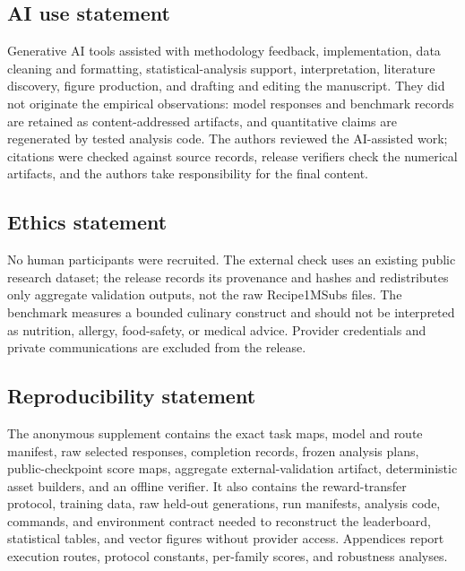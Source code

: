 \documentclass{article}
\begin{document}
\clearpage
\subsection*{AI use statement}

Generative AI tools assisted with methodology feedback, implementation, data cleaning and
formatting, statistical-analysis support, interpretation, literature discovery, figure production,
and drafting and editing the manuscript. They did not originate the empirical observations: model
responses and benchmark records are retained as content-addressed artifacts, and quantitative
claims are regenerated by tested analysis code. The authors reviewed the AI-assisted work;
citations were checked against source records, release verifiers check the numerical artifacts, and
the authors take responsibility for the final content.

\subsection*{Ethics statement}

No human participants were recruited. The external check uses an existing public research dataset;
the release records its provenance and hashes and redistributes only aggregate validation outputs,
not the raw Recipe1MSubs files. The benchmark measures a bounded culinary construct and should not
be interpreted as nutrition, allergy, food-safety, or medical advice. Provider credentials and
private communications are excluded from the release.

\subsection*{Reproducibility statement}

The anonymous supplement contains the exact task maps, model and route manifest, raw selected
responses, completion records, frozen analysis plans, public-checkpoint score maps, aggregate
external-validation artifact, deterministic asset builders, and an offline verifier. It also
contains the reward-transfer protocol, training data, raw held-out generations, run manifests,
analysis code, commands, and environment contract needed to reconstruct the leaderboard,
statistical tables, and vector figures without provider access. Appendices report execution routes,
protocol constants, per-family scores, and robustness analyses.



\end{document}
